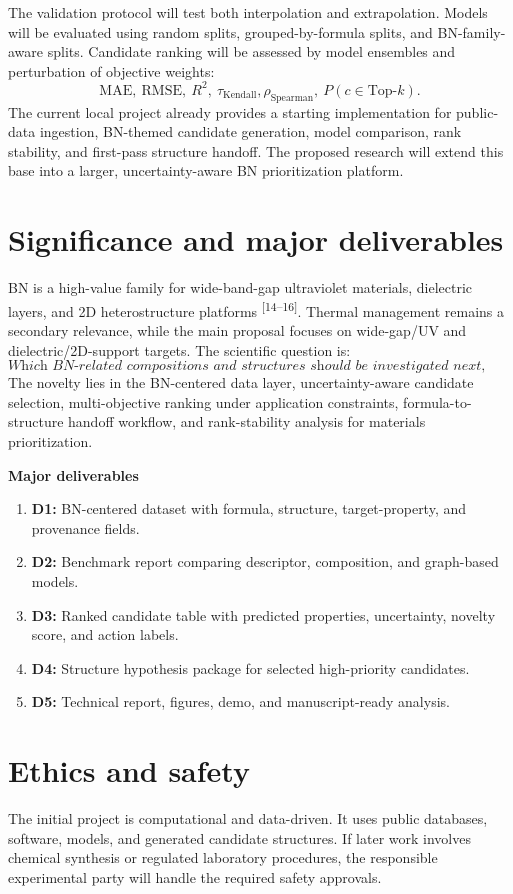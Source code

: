 \documentclass[10pt]{article}
\begin{document}
The validation protocol will test both interpolation and extrapolation. Models will be evaluated using random splits, grouped-by-formula splits, and BN-family-aware splits. Candidate ranking will be assessed by model ensembles and perturbation of objective weights:
\[
  \mathrm{MAE},\ \mathrm{RMSE},\ R^2,\ \tau_{\mathrm{Kendall}},
  \rho_{\mathrm{Spearman}},\ P(c\in\mathrm{Top}\text{-}k).
\]
The current local project already provides a starting implementation for public-data ingestion, BN-themed candidate generation, model comparison, rank stability, and first-pass structure handoff. The proposed research will extend this base into a larger, uncertainty-aware BN prioritization platform.

\section*{Significance and major deliverables}
BN is a high-value family for wide-band-gap ultraviolet materials, dielectric layers, and 2D heterostructure platforms \textsuperscript{[14--16]}. Thermal management remains a secondary relevance, while the main proposal focuses on wide-gap/UV and dielectric/2D-support targets. The scientific question is:
\[
  \textit{Which BN-related compositions and structures should be investigated next, and with what level of uncertainty?}
\]
The novelty lies in the BN-centered data layer, uncertainty-aware candidate selection, multi-objective ranking under application constraints, formula-to-structure handoff workflow, and rank-stability analysis for materials prioritization.

\textbf{Major deliverables}
\begin{enumerate}
  \item \textbf{D1:} BN-centered dataset with formula, structure, target-property, and provenance fields.
  \item \textbf{D2:} Benchmark report comparing descriptor, composition, and graph-based models.
  \item \textbf{D3:} Ranked candidate table with predicted properties, uncertainty, novelty score, and action labels.
  \item \textbf{D4:} Structure hypothesis package for selected high-priority candidates.
  \item \textbf{D5:} Technical report, figures, demo, and manuscript-ready analysis.
\end{enumerate}

\section*{Ethics and safety}
The initial project is computational and data-driven. It uses public databases, software, models, and generated candidate structures. If later work involves chemical synthesis or regulated laboratory procedures, the responsible experimental party will handle the required safety approvals.
\end{document}
